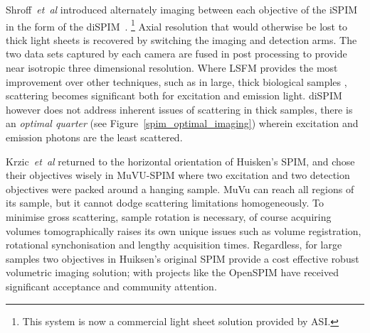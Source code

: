 Shroff~\emph{et~al} introduced alternately imaging between each objective of the iSPIM in the form of the diSPIM~\cite{kumar_dual-view_2014}. %
\footnote{This system is now a commercial light sheet solution provided by ASI.}
Axial resolution that would otherwise be lost to thick light sheets is recovered by switching the imaging and detection arms.
The two data sets captured by each camera are fused in post processing to provide near isotropic three dimensional resolution.
Where LSFM provides the most improvement over other techniques, such as in large, thick biological samples
, scattering becomes significant both for excitation and emission light.
diSPIM however does not address inherent issues of scattering in thick samples, there is an \emph{optimal quarter} (see Figure~\ref{spim_optimal_imaging}) wherein excitation and emission photons are the least scattered.

Krzic~\emph{et~al} returned to the horizontal orientation of Huisken's SPIM, and chose their objectives wisely in MuVU-SPIM where two excitation and two detection objectives were packed around a hanging sample.
MuVu can reach all regions of its sample, but it cannot dodge scattering limitations homogeneously.
To minimise gross scattering, sample rotation is necessary, of course acquiring volumes tomographically raises its own unique issues such as volume registration, rotational synchonisation and lengthy acquisition times.
Regardless, for large samples two objectives in Huiksen's original SPIM provide a cost effective robust volumetric imaging solution; with projects like the OpenSPIM have received significant acceptance and community attention.

